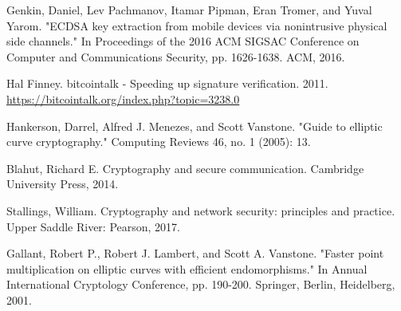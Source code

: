 \documentclass{article}
\begin{document}
\begin{thebibliography}{99}

Genkin, Daniel, Lev Pachmanov, Itamar Pipman, Eran Tromer, and Yuval Yarom. "ECDSA key extraction from mobile devices via nonintrusive physical side channels." In Proceedings of the 2016 ACM SIGSAC Conference on Computer and Communications Security, pp. 1626-1638. ACM, 2016.

Hal Finney. bitcointalk - Speeding up signature verification. 2011.
\url{https://bitcointalk.org/index.php?topic=3238.0}

Hankerson, Darrel, Alfred J. Menezes, and Scott Vanstone. "Guide to elliptic curve cryptography." Computing Reviews 46, no. 1 (2005): 13.

Blahut, Richard E. Cryptography and secure communication. Cambridge University Press, 2014.

Stallings, William. Cryptography and network security: principles and practice. Upper Saddle River: Pearson, 2017.

Gallant, Robert P., Robert J. Lambert, and Scott A. Vanstone. "Faster point multiplication on elliptic curves with efficient endomorphisms." In Annual International Cryptology Conference, pp. 190-200. Springer, Berlin, Heidelberg, 2001.

\end{thebibliography}
\end{document}
